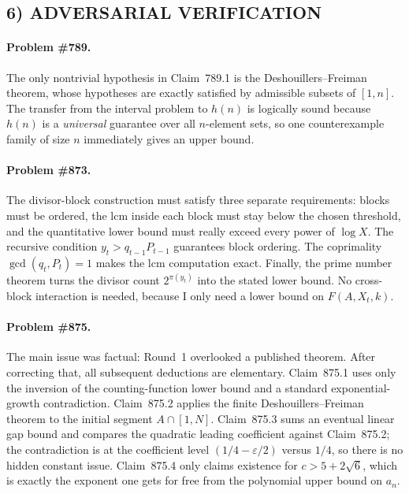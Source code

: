 \subsection*{6) ADVERSARIAL VERIFICATION}

\paragraph{Problem \#789.}
The only nontrivial hypothesis in Claim~789.1 is the Deshouillers--Freiman theorem, whose hypotheses are exactly satisfied by admissible subsets of \([1,n]\). The transfer from the interval problem to \(h(n)\) is logically sound because \(h(n)\) is a \emph{universal} guarantee over all \(n\)-element sets, so one counterexample family of size \(n\) immediately gives an upper bound.

\paragraph{Problem \#873.}
The divisor-block construction must satisfy three separate requirements: blocks must be ordered, the lcm inside each block must stay below the chosen threshold, and the quantitative lower bound must really exceed every power of \(\log X\). The recursive condition \(y_t>q_{t-1}P_{t-1}\) guarantees block ordering. The coprimality \(\gcd(q_t,P_t)=1\) makes the lcm computation exact. Finally, the prime number theorem turns the divisor count \(2^{\pi(y_t)}\) into the stated lower bound. No cross-block interaction is needed, because I only need a lower bound on \(F(A,X_t,k)\).

\paragraph{Problem \#875.}
The main issue was factual: Round~1 overlooked a published theorem. After correcting that, all subsequent deductions are elementary. Claim~875.1 uses only the inversion of the counting-function lower bound and a standard exponential-growth contradiction. Claim~875.2 applies the finite Deshouillers--Freiman theorem to the initial segment \(A\cap[1,N]\). Claim~875.3 sums an eventual linear gap bound and compares the quadratic leading coefficient against Claim~875.2; the contradiction is at the coefficient level \((1/4-\varepsilon/2)\) versus \(1/4\), so there is no hidden constant issue. Claim~875.4 only claims existence for \(c>5+2\sqrt6\), which is exactly the exponent one gets for free from the polynomial upper bound on \(a_n\).

